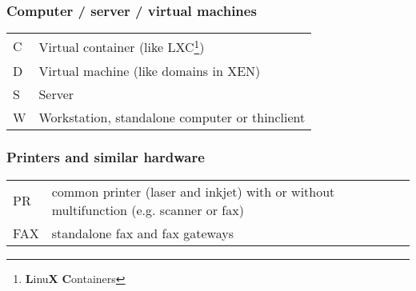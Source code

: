 \subsubsection{Computer / server / virtual machines}

\begin{savenotes}
\begin{tabular}{p{1.4cm}p{15cm}}
	C	& Virtual container (like LXC\footnote{\textbf{L}inu\textbf{X} \textbf{C}ontainers}) \\

	D	& Virtual machine (like domains in XEN) \\

	S	& Server \\

	W	& Workstation, standalone computer or thinclient \\
\end{tabular}
\end{savenotes}



\subsubsection{Printers and similar hardware}

\begin{tabular}{p{1.4cm}p{15cm}}
	PR	& common printer (laser and inkjet) with or without multifunction (e.g.
		scanner or fax) \\

	FAX	& standalone fax and fax gateways \\
\end{tabular}
